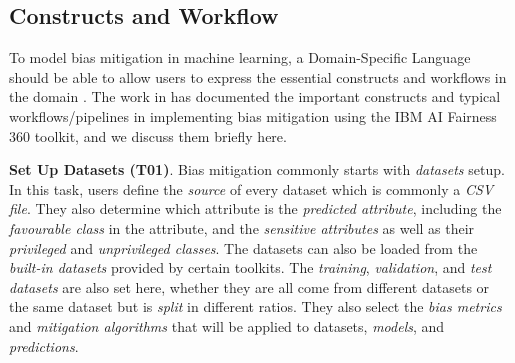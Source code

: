 \documentclass[sigconf,review]{acmart}
\begin{document}
{		\subsection{Constructs and Workflow}
		\label{sec:constructs_and_workflow}
		
		To model bias mitigation in machine learning, a Domain-Specific Language should be able to allow users to express the essential constructs and workflows in the domain \cite{volter2013model}. The work in \cite{bellamy2018ai} has documented the important constructs and typical workflows/pipelines in implementing bias mitigation using the IBM AI Fairness 360 toolkit, and we discuss them briefly here.
		
		
		\textbf{Set Up Datasets (T01)}. Bias mitigation commonly starts with \textit{datasets} setup. In this task, users define the \textit{source} of every dataset which is commonly a \textit{CSV file}. They also determine which attribute is the \textit{predicted attribute}, including the \textit{favourable class} in the attribute, and the \textit{sensitive attributes} as well as their \textit{privileged} and \textit{unprivileged classes}. The datasets can also be loaded from the \textit{built-in datasets} provided by certain toolkits. 
		The \textit{training}, \textit{validation}, and \textit{test datasets} are also set here, whether they are all come from different datasets or the same dataset but is \textit{split} in different ratios. They also select the \textit{bias metrics} and \textit{mitigation algorithms} that will be applied to datasets, \textit{models}, and \textit{predictions}. 
		
}
\end{document}
